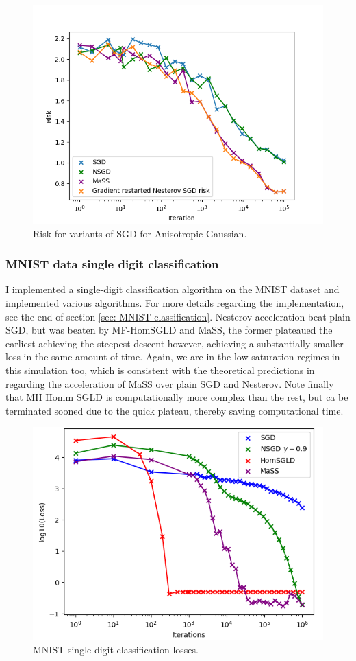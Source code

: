 \documentclass{article}
\theoremstyle{mystyle}
\begin{document}
\begin{figure}[H]
    \centering
    \includegraphics[width=0.55\linewidth]{images/Nguyen2018-SGD-algos-risk-aniso-gauss.png}
    \caption{Risk for variants of SGD for Anisotropic Gaussian.}
    \label{fig: sgd risk anisotropic gauss}
\end{figure}
 
\newpage
\subsubsection{MNIST data single digit classification}\label{sec: single digit classification}

I implemented a single-digit classification algorithm on the MNIST dataset and implemented various algorithms. For more details regarding the implementation, see the end of section \ref{sec: MNIST classification}.	Nesterov acceleration beat plain SGD, but was beaten by MF-HomSGLD and MaSS, the former plateaued the earliest achieving the steepest descent however, achieving a substantially smaller loss in the same amount of time. Again, we are in the low saturation regimes in this simulation too, which is consistent with the theoretical predictions in \cite{liu2019acceleratingsgdmomentumoverparameterized} regarding the acceleration of MaSS over plain SGD and Nesterov. Note finally that MH Homm SGLD is computationally more complex than the rest, but ca be terminated sooned due to the quick plateau, thereby saving computational time.


\vspace{3cm}

\begin{figure}[H]
   \centering
   \includegraphics[width=0.7\linewidth]{images/Spiliopoulos2019-SGD-algos-single-digit-classification.png}
   \caption{MNIST single-digit classification losses.}
   \label{fig: MNIST losses}
 \end{figure}
\end{document}
